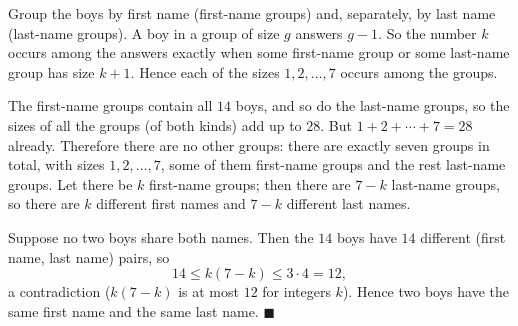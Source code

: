 Group the boys by first name (first-name groups) and, separately, by last name (last-name groups). A boy in a group of size $g$ answers $g-1$. So the number $k$ occurs among the answers exactly when some first-name group or some last-name group has size $k+1$. Hence each of the sizes $1,2,\dots,7$ occurs among the groups.

The first-name groups contain all $14$ boys, and so do the last-name groups, so the sizes of all the groups (of both kinds) add up to $28$. But $1+2+\cdots+7=28$ already. Therefore there are no other groups: there are exactly seven groups in total, with sizes $1,2,\dots,7$, some of them first-name groups and the rest last-name groups. Let there be $k$ first-name groups; then there are $7-k$ last-name groups, so there are $k$ different first names and $7-k$ different last names.

Suppose no two boys share both names. Then the $14$ boys have $14$ different (first name, last name) pairs, so
\[
14\le k(7-k)\le3\cdot4=12,
\]
a contradiction ($k(7-k)$ is at most $12$ for integers $k$). Hence two boys have the same first name and the same last name. $\blacksquare$
